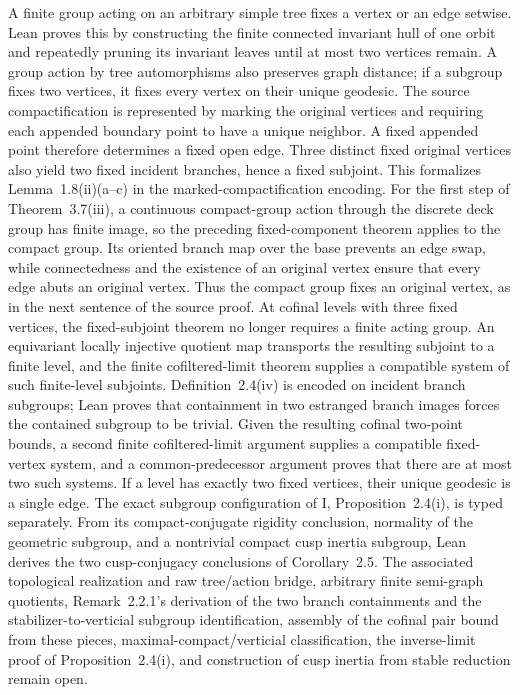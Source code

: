 \begin{definition}
  A finite group acting on an arbitrary simple tree fixes a vertex or an edge
  setwise.  Lean proves this by constructing the finite connected invariant
  hull of one orbit and repeatedly pruning its invariant leaves until at most
  two vertices remain.  A group action by tree automorphisms also preserves
  graph distance; if a subgroup fixes two vertices, it fixes every vertex on
  their unique geodesic.  The source compactification is represented by marking
  the original vertices and requiring each appended boundary point to have a
  unique neighbor.  A fixed appended point therefore determines a fixed open
  edge.  Three distinct fixed original vertices also yield two fixed incident
  branches, hence a fixed subjoint.  This formalizes Lemma~1.8(ii)(a--c) in the
  marked-compactification encoding.  For the first step of Theorem~3.7(iii),
  a continuous compact-group action through the discrete deck group has finite
  image, so the preceding fixed-component theorem applies to the compact
  group.  Its oriented branch map over the base prevents an edge swap, while
  connectedness and the existence of an original vertex ensure that every
  edge abuts an original vertex.  Thus the compact group fixes an original
  vertex, as in the next sentence of the source proof.  At cofinal levels with
  three fixed vertices, the fixed-subjoint theorem no longer requires a finite
  acting group.  An equivariant locally injective quotient map transports the
  resulting subjoint to a finite level, and the finite cofiltered-limit theorem
  supplies a compatible system of such finite-level subjoints.  Definition~2.4(iv)
  is encoded on incident branch subgroups; Lean proves that containment in two
  estranged branch images forces the contained subgroup to be trivial.  Given
  the resulting cofinal two-point bounds, a second finite cofiltered-limit
  argument supplies a compatible fixed-vertex system, and a common-predecessor
  argument proves that there are at most two such systems.  If a level has
  exactly two fixed vertices, their unique geodesic is a single edge.  The exact subgroup
  configuration of \IUT{} I, Proposition~2.4(i), is typed separately.  From
  its compact-conjugate rigidity conclusion, normality of the geometric
  subgroup, and a nontrivial compact cusp inertia subgroup, Lean derives the
  two cusp-conjugacy conclusions of Corollary~2.5.  The associated topological
  realization and raw tree/action bridge, arbitrary finite semi-graph quotients, Remark~2.2.1's
  derivation of the two branch containments and the stabilizer-to-verticial
  subgroup identification, assembly of the cofinal pair bound from these
  pieces, maximal-compact/verticial classification, the
  inverse-limit proof of Proposition~2.4(i), and construction of cusp inertia
  from stable reduction remain open.
\end{definition}

